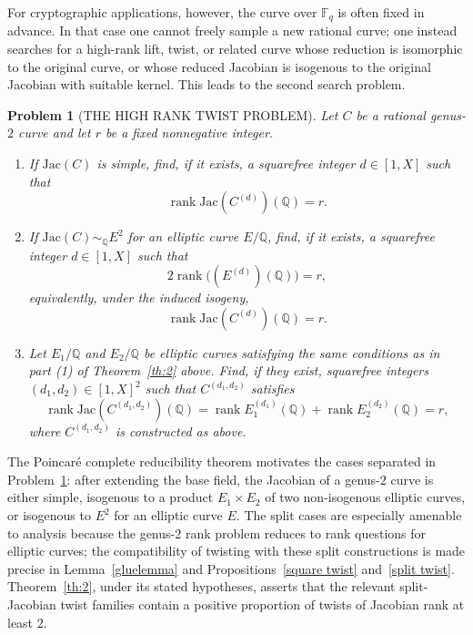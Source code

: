 \documentclass{amsart}
\newcommand{\F}{{\mathbb F}}
\newcommand{\Jac}{\mathrm{Jac}}
\newtheorem{problem}{Problem}
\begin{document}
For cryptographic applications, however, the curve over \(\F_q\) is often fixed
in advance. In that case one cannot freely sample a new rational curve; one
instead searches for a high-rank lift, twist, or related curve whose reduction is
isomorphic to the original curve, or whose reduced Jacobian is isogenous to the
original Jacobian with suitable kernel. This leads to the second search problem.
\begin{problem}[THE HIGH RANK TWIST PROBLEM]\label{prob:twist}
Let \(C\) be a rational genus-\(2\) curve and let \(r\) be a fixed nonnegative
integer.

\begin{enumerate}
\item If \(\Jac(C)\) is simple, find, if it exists, a squarefree integer
\(d\in[1,X]\) such that
\[
\operatorname{rank}\Jac(C^{(d)})(\mathbb Q)=r.
\]
\item If \(\Jac(C)\sim_{\mathbb Q}E^2\) for an elliptic curve \(E/\mathbb Q\),
find, if it exists, a squarefree integer \(d\in[1,X]\) such that
\[
2\operatorname{rank}\bigl((E^{(d)})(\mathbb Q)\bigr)=r,
\]
equivalently, under the induced isogeny,
\[
\operatorname{rank}\Jac(C^{(d)})(\mathbb Q)=r.
\]
\item Let \(E_1/\mathbb Q\) and \(E_2/\mathbb Q\) be elliptic curves satisfying
the same conditions as in part (1) of Theorem~\ref{th:2} above. Find, if they exist, squarefree
integers \((d_1,d_2)\in[1,X]^2\) such that \(C^{(d_1,d_2)}\) satisfies
\[
\operatorname{rank}\Jac(C^{(d_1,d_2)})(\mathbb Q)
=
\operatorname{rank}E_1^{(d_1)}(\mathbb Q)
+
\operatorname{rank}E_2^{(d_2)}(\mathbb Q)
=r,
\]
where \(C^{(d_1,d_2)}\) is constructed as above.
\end{enumerate}
\end{problem}

The Poincar\'e complete reducibility theorem motivates the cases separated in
Problem~\ref{prob:twist}: after extending the base field, the Jacobian of a
genus-\(2\) curve is either simple, isogenous to a product \(E_1\times E_2\) of
two non-isogenous elliptic curves, or isogenous to \(E^2\) for an elliptic curve
\(E\). The split cases are especially amenable to analysis because the genus-\(2\)
rank problem reduces to rank questions for elliptic curves; the compatibility of
twisting with these split constructions is made precise in Lemma~\ref{gluelemma}
and Propositions~\ref{square twist} and~\ref{split twist}. Theorem~\ref{th:2},
under its stated hypotheses, asserts that the relevant split-Jacobian twist
families contain a positive proportion of twists of Jacobian rank at least \(2\).
\end{document}
